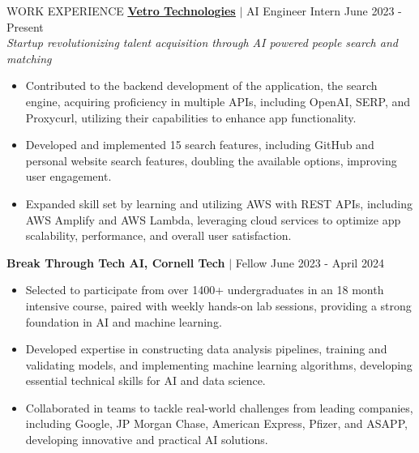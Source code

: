 \documentclass{resume} %
\begin{document}
\vspace{-0.4em}
\begin{rSection}{WORK EXPERIENCE}
{\href{https://www.vetro.ai/}{\textbf{\underline{Vetro Technologies}}} $\vert$ AI Engineer Intern} \hfill June 2023 - Present \\
\textit{Startup revolutionizing talent acquisition through AI powered people search and matching}
\vspace{-0.5em}
\begin{itemize}
\item Contributed to the backend development of the application, the search engine, acquiring proficiency in multiple APIs, including OpenAI, SERP, and Proxycurl, utilizing their capabilities to enhance app functionality.
\vspace{-0.4em}
\item Developed and implemented 15 search features, including GitHub and personal website search features, doubling the available options, improving user engagement.
\vspace{-0.4em}
\item Expanded skill set by learning and utilizing AWS with REST APIs, including AWS Amplify and AWS Lambda, leveraging cloud services to optimize app scalability, performance, and overall user satisfaction.
\end{itemize}


{\textbf{Break Through Tech AI, Cornell Tech} $\vert$ Fellow} \hfill June 2023 - April 2024 \\
\vspace{-1.5em}
\begin{itemize}
\item Selected to participate from over 1400+ undergraduates in an 18 month intensive course, paired with weekly hands-on lab sessions, providing a strong foundation in AI and machine learning.
\vspace{-0.4em}
\item Developed expertise in constructing data analysis pipelines, training and validating models, and implementing machine learning algorithms, developing essential technical skills for AI and data science.
\vspace{-0.4em}
\item Collaborated in teams to tackle real-world challenges from leading companies, including Google, JP Morgan Chase, American Express, Pfizer, and ASAPP, developing innovative and practical AI solutions.
\end{itemize}

\end{rSection}
\end{document}
